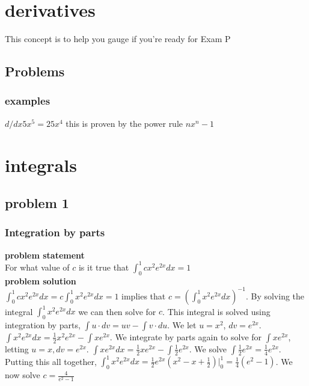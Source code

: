 \documentclass{article}
\author{Matthew Thomas }
\date{February 2020}
\begin{document}
\maketitle

\section{derivatives}
This concept is to help you gauge if you're ready for Exam P
\subsection{Problems}
\subsubsection{examples}$d/dx 5x^5=25x^4 $ this is proven by the power rule $ nx^n-1 $


\section{integrals}
\subsection{problem 1}
\subsubsection{Integration by parts}
\textbf{problem statement} \\
For what value of $c$ is it true that $\int_{0}^{1} c x^2 e^{2x} dx = 1$ \\
\textbf{problem solution} \\
$\int_{0}^{1} c x^2 e^{2x} dx = c \int_{0}^{1} x^2 e^{2x} dx = 1$ implies that $c = (\int_{0}^{1} x^2 e^{2x} dx)^{-1}$. By solving the integral $\int_{0}^{1} x^2 e^{2x} dx $ we can then solve for $c$. This integral is solved using integration by parts, $\int u \cdot dv = uv - \int v \cdot du$. We let $u = x^2$, $dv = e^{2x}$. $\int x^2 e^{2x} dx = \frac{1}{2}x^2 e^{2x} - \int x e^{2x}$. We integrate by parts again to solve for $\int x e^{2x}$, letting $u = x, dv = e^{2x}$. $\int x e^{2x} dx = \frac{1}{2}x e^{2x} - \int \frac{1}{2}e^{2x}$. We solve $\int \frac{1}{2}e^{2x} = \frac{1}{4}e^{2x}$. Putting this all together, $\int_{0}^{1} x^2 e^{2x} dx = \frac{1}{2}e^{2x}(x^2-x+\frac{1}{2}) \big|_0^1 = \frac{1}{4}(e^2-1)$. We now solve $c = \frac{\displaystyle{4}}{\displaystyle{e^2-1}}$
\end{document}
